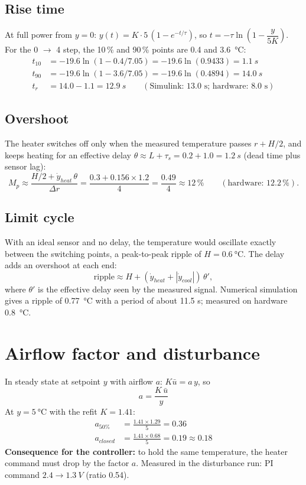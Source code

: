\documentclass[11pt,a4paper]{article}
\begin{document}
\subsection{Rise time}
At full power from $y = 0$: $y(t) = K\cdot5\,(1 - e^{-t/\tau})$, so $t = -\tau\ln\left(1 - \dfrac{y}{5K}\right)$.
For the 0 $\to$ 4 step, the 10\,\% and 90\,\% points are 0.4 and \SI{3.6}{\celsius}:
\begin{align*}
t_{10} &= -19.6\ln(1 - 0.4/7.05) = -19.6\ln(0.9433) = \SI{1.1}{s}\\
t_{90} &= -19.6\ln(1 - 3.6/7.05) = -19.6\ln(0.4894) = \SI{14.0}{s}\\
t_r &= 14.0 - 1.1 = \boxed{\SI{12.9}{s}}\qquad(\text{Simulink: } 13.0\text{ s; hardware: } 8.0\text{ s})
\end{align*}

\subsection{Overshoot}
The heater switches off only when the measured temperature passes $r + H/2$, and keeps heating for
an effective delay $\theta \approx L + \tau_s = 0.2 + 1.0 = \SI{1.2}{s}$ (dead time plus sensor lag):
\[
M_p \approx \frac{H/2 + \dot y_{heat}\,\theta}{\Delta r} = \frac{0.3 + 0.156\times1.2}{4} = \frac{0.49}{4} \approx \boxed{12\,\%}
\qquad(\text{hardware: } 12.2\,\%).
\]

\subsection{Limit cycle}
With an ideal sensor and no delay, the temperature would oscillate exactly between the switching
points, a peak-to-peak ripple of $H = \SI{0.6}{\celsius}$. The delay adds an overshoot at each end:
\[
\text{ripple} \approx H + (\dot y_{heat} + |\dot y_{cool}|)\,\theta' ,
\]
where $\theta'$ is the effective delay seen by the measured signal. Numerical simulation gives a
ripple of \SI{0.77}{\celsius} with a period of about 11.5 s; measured on hardware \SI{0.8}{\celsius}.

\section{Airflow factor and disturbance}

In steady state at setpoint $y$ with airflow $a$: $K\bar u = a\,y$, so
\[
\boxed{\;a = \frac{K\,\bar u}{y}\;}
\]
At $y = \SI{5}{\celsius}$ with the refit $K = 1.41$:
\begin{align*}
a_{50\%} &= \frac{1.41\times1.29}{5} = \boxed{0.36}\\
a_{closed} &= \frac{1.41\times0.68}{5} = 0.19 \approx \boxed{0.18}
\end{align*}
\textbf{Consequence for the controller:} to hold the same temperature, the heater command must drop
by the factor $a$. Measured in the disturbance run: PI command $2.4 \to \SI{1.3}{V}$ (ratio 0.54).
\end{document}
